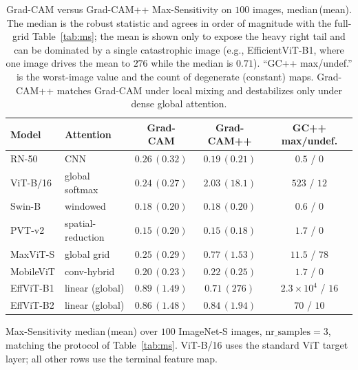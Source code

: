 \documentclass[final,5p,times,twocolumn]{elsarticle}
\begin{document}
\begin{table}[!t]
\centering
\caption{Grad-CAM versus Grad-CAM++ Max-Sensitivity on $100$ images, median\,(mean). The median is the robust statistic and agrees in order of magnitude with the full-grid Table~\ref{tab:ms}; the mean is shown only to expose the heavy right tail and can be dominated by a single catastrophic image (e.g., EfficientViT-B1, where one image drives the mean to $276$ while the median is $0.71$). ``GC++ max/undef.'' is the worst-image value and the count of degenerate (constant) maps. Grad-CAM++ matches Grad-CAM under local mixing and destabilizes only under dense global attention.}
\label{tab:cam_ms}
\begin{tabular}{llccc}
\toprule
Model & Attention & Grad-CAM & Grad-CAM++ & GC++ max/undef. \\
\midrule
RN-50     & CNN               & $0.26\,(0.32)$ & $0.19\,(0.21)$ & $0.5$ / $0$ \\
ViT-B/16  & global softmax    & $0.24\,(0.27)$ & $2.03\,(18.1)$ & $523$ / $12$ \\
Swin-B    & windowed          & $0.18\,(0.20)$ & $0.18\,(0.20)$ & $0.6$ / $0$ \\
PVT-v2    & spatial-reduction & $0.15\,(0.20)$ & $0.15\,(0.18)$ & $1.7$ / $0$ \\
MaxViT-S  & global grid       & $0.25\,(0.29)$ & $0.77\,(1.53)$ & $11.5$ / $78$ \\
MobileViT & conv-hybrid       & $0.20\,(0.23)$ & $0.22\,(0.25)$ & $1.7$ / $0$ \\
EffViT-B1 & linear (global)   & $0.89\,(1.49)$ & $0.71\,(276)$  & $2.3\!\times\!10^{4}$ / $16$ \\
EffViT-B2 & linear (global)   & $0.86\,(1.48)$ & $0.84\,(1.94)$ & $70$ / $10$ \\
\bottomrule
\end{tabular}

\vspace{2pt}
\raggedright\footnotesize Max-Sensitivity median\,(mean) over $100$ ImageNet-S images, $\mathrm{nr\_samples}=3$, matching the protocol of Table~\ref{tab:ms}. ViT-B/16 uses the standard ViT target layer; all other rows use the terminal feature map.
\end{table}
\end{document}
